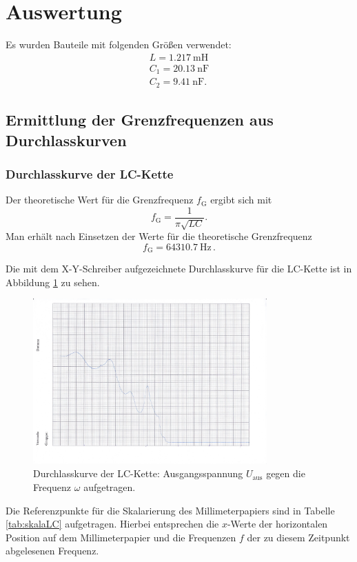 \section{Auswertung}
\label{sec:Auswertung}

Es wurden Bauteile mit folgenden Größen verwendet:
\begin{gather*}
	L = \SI{1.217}{\milli\henry} \\
	C_1 = \SI{20.13}{\nano\farad} \\
	C_2 = \SI{9.41}{\nano\farad} \text{.}
\end{gather*}


\subsection{Ermittlung der Grenzfrequenzen aus Durchlasskurven}

\subsubsection{Durchlasskurve der LC-Kette}
Der theoretische Wert für die Grenzfrequenz $f_{\text{G}}$ ergibt sich mit 
\begin{equation}
	f_{\text{G}} = \frac{1}{\pi \sqrt{LC}} \text{.}
\end{equation}
Man erhält nach Einsetzen der Werte für die theoretische Grenzfrequenz 
\begin{equation*}
	f_{\text{G}} = \SI{64310.7}{\hertz} \, \text{.}
\end{equation*}

Die mit dem X-Y-Schreiber aufgezeichnete Durchlasskurve für die LC-Kette ist in Abbildung 
\ref{fig:durchiLC} zu sehen.
\begin{figure}
	\centering
	\includegraphics[width=0.8\textwidth]{Bilder/durchlasskurve_lc_kette.jpg}
	\caption{Durchlasskurve der LC-Kette: Ausgangsspannung $U_{\text{aus}}$ gegen die 
	Frequenz $\omega$ aufgetragen.}
	\label{fig:durchiLC}
\end{figure}
Die Referenzpunkte für die Skalarierung des Millimeterpapiers sind in Tabelle 
\ref{tab:skalaLC} aufgetragen. Hierbei entsprechen die $x$-Werte der horizontalen Position 
auf dem Millimeterpapier und die Frequenzen $f$ der zu diesem Zeitpunkt abgelesenen Frequenz.

